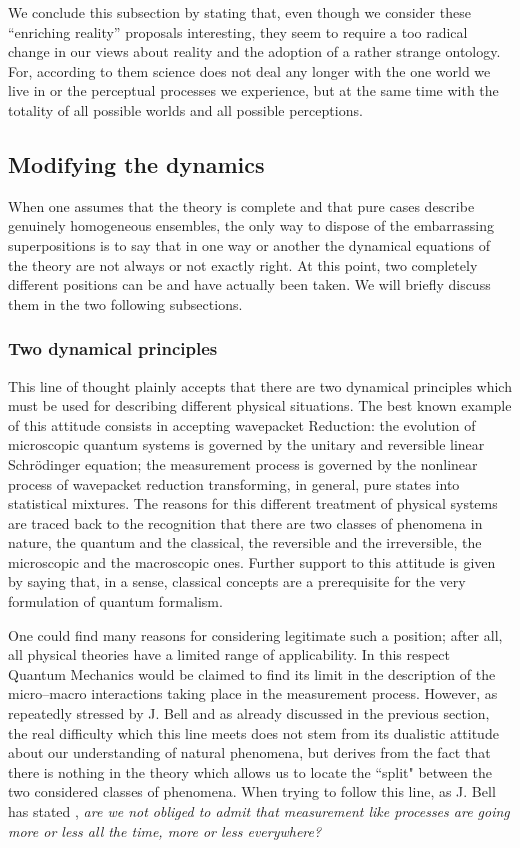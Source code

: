 \documentclass[10pt,a4paper]{article}
\begin{document}
We conclude this subsection by stating that, even though we
consider these ``enriching reality'' proposals interesting, they
seem to require a too radical change in our views about reality
and the adoption of a rather strange ontology. For, according to
them science does not deal any longer with the one world we live
in or the perceptual processes we experience, but at the same time
with the totality of all possible worlds and all possible
perceptions.


\subsection{Modifying the dynamics} \label{sec37}

When one assumes that the theory is complete and that pure cases
describe genuinely homogeneous ensembles, the only way to dispose
of the embarrassing superpositions is to say that in one way or
another the dynamical equations of the theory are not always or
not exactly right. At this point, two completely different
positions can be and have actually been taken. We will briefly
discuss them in the two following subsections.


\subsubsection{Two dynamical principles} \label{sec371}

This line of thought plainly accepts that there are two dynamical
principles which must be used for describing different physical
situations. The best known example of this attitude consists in
accepting wavepacket Reduction: the evolution of microscopic
quantum systems is governed by the unitary and reversible linear
Schr\"odinger equation; the measurement process is governed by the
nonlinear process of wavepacket reduction transforming, in
general, pure states into statistical mixtures. The reasons for
this different treatment of physical systems are traced back to
the recognition that there are two classes of phenomena in nature,
the quantum and the classical, the reversible and the
irreversible, the microscopic and the macroscopic ones. Further
support to this attitude is given by saying that, in a sense,
classical concepts are a prerequisite for the very formulation of
quantum formalism.

One could find many reasons for considering legitimate such a
position; after all, all physical theories have a limited range of
applicability. In this respect Quantum Mechanics would be claimed
to find its limit in the description of the micro--macro
interactions taking place in the measurement process. However, as
repeatedly stressed by J. Bell and as already discussed in the
previous section, the real difficulty which this line meets does
not stem from its dualistic attitude about our understanding of
natural phenomena, but derives from the fact that there is nothing
in the theory which allows us to locate the ``split" between the
two considered classes of phenomena. When trying to follow this
line, as J. Bell has stated \cite{bellam}, {\it are we not obliged
to admit that measurement like processes are going more or less
all the time, more or less everywhere?}
\end{document}
